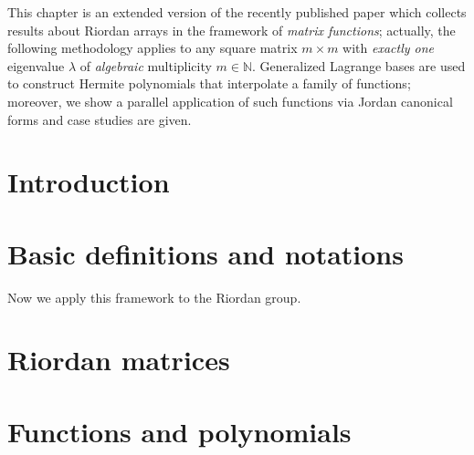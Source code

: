 


This chapter is an extended version of the recently published paper
\citep{MERLINI2019177} which collects results about
Riordan arrays in the framework of \textit{matrix functions};  actually,
the following methodology applies to any square matrix $m\times m$ with
\textit{exactly one} eigenvalue $\lambda$ of \textit{algebraic}
multiplicity $m \in\mathbb{N}$.  Generalized Lagrange bases are used to
construct Hermite polynomials that interpolate a family of functions;
moreover, we show a parallel application of such functions via Jordan
canonical forms and case studies are given.


\section{Introduction}

\label{sec:matrices:functions:introduction}


\section{Basic definitions and notations}



Now we apply this framework to the Riordan group.

\section{Riordan matrices}



\iffalse %



\subsection{A component matrices characterization of Hermite interpolating polynomials}


\fi

\section{Functions and polynomials}

